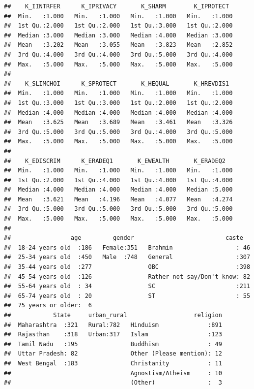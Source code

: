 \documentclass[
]{article}
\begin{document}
\begin{verbatim}
##    K_IINTRFER      K_IPRIVACY       K_SHARM        K_IPROTECT   
##  Min.   :1.000   Min.   :1.000   Min.   :1.000   Min.   :1.000  
##  1st Qu.:2.000   1st Qu.:2.000   1st Qu.:3.000   1st Qu.:2.000  
##  Median :3.000   Median :3.000   Median :4.000   Median :3.000  
##  Mean   :3.202   Mean   :3.055   Mean   :3.823   Mean   :2.852  
##  3rd Qu.:4.000   3rd Qu.:4.000   3rd Qu.:5.000   3rd Qu.:4.000  
##  Max.   :5.000   Max.   :5.000   Max.   :5.000   Max.   :5.000  
##                                                                 
##    K_SLIMCHOI      K_SPROTECT       K_HEQUAL       K_HREVDIS1   
##  Min.   :1.000   Min.   :1.000   Min.   :1.000   Min.   :1.000  
##  1st Qu.:3.000   1st Qu.:3.000   1st Qu.:2.000   1st Qu.:2.000  
##  Median :4.000   Median :4.000   Median :4.000   Median :4.000  
##  Mean   :3.625   Mean   :3.689   Mean   :3.461   Mean   :3.326  
##  3rd Qu.:5.000   3rd Qu.:5.000   3rd Qu.:4.000   3rd Qu.:5.000  
##  Max.   :5.000   Max.   :5.000   Max.   :5.000   Max.   :5.000  
##                                                                 
##    K_EDISCRIM      K_ERADEQ1       K_EWEALTH       K_ERADEQ2    
##  Min.   :1.000   Min.   :1.000   Min.   :1.000   Min.   :1.000  
##  1st Qu.:2.000   1st Qu.:4.000   1st Qu.:4.000   1st Qu.:4.000  
##  Median :4.000   Median :4.000   Median :4.000   Median :5.000  
##  Mean   :3.621   Mean   :4.196   Mean   :4.077   Mean   :4.274  
##  3rd Qu.:5.000   3rd Qu.:5.000   3rd Qu.:5.000   3rd Qu.:5.000  
##  Max.   :5.000   Max.   :5.000   Max.   :5.000   Max.   :5.000  
##                                                                 
##                 age         gender                          caste    
##  18-24 years old  :186   Female:351   Brahmin                  : 46  
##  25-34 years old  :450   Male  :748   General                  :307  
##  35-44 years old  :277                OBC                      :398  
##  45-54 years old  :126                Rather not say/Don't know: 82  
##  55-64 years old  : 34                SC                       :211  
##  65-74 years old  : 20                ST                       : 55  
##  75 years or older:  6                                               
##            State     urban_rural                   religion  
##  Maharashtra  :321   Rural:782   Hinduism              :891  
##  Rajasthan    :318   Urban:317   Islam                 :123  
##  Tamil Nadu   :195               Buddhism              : 49  
##  Uttar Pradesh: 82               Other (Please mention): 12  
##  West Bengal  :183               Christanity           : 11  
##                                  Agnostism/Atheism     : 10  
##                                  (Other)               :  3
\end{verbatim}
\end{document}
